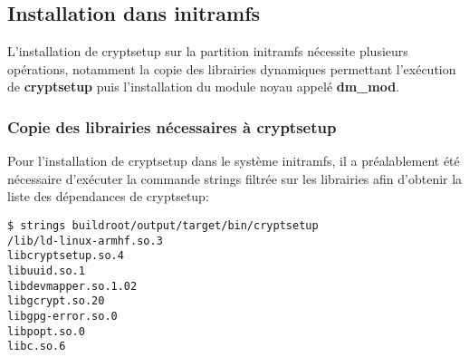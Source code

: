 \subsection{Installation dans initramfs}
L'installation de cryptsetup sur la partition initramfs nécessite plusieurs opérations, notamment la copie des librairies dynamiques permettant l'exécution de \textbf{cryptsetup} puis l'installation du module noyau appelé \textbf{dm\_mod}.

\subsubsection{Copie des librairies nécessaires à cryptsetup}
Pour l'installation de cryptsetup dans le système initramfs, il a préalablement été nécessaire d'exécuter la commande strings filtrée sur les librairies afin d'obtenir la liste des dépendances de cryptsetup:
\begin{lstlisting}[style=Bash]
$ strings buildroot/output/target/bin/cryptsetup
/lib/ld-linux-armhf.so.3
libcryptsetup.so.4
libuuid.so.1
libdevmapper.so.1.02
libgcrypt.so.20
libgpg-error.so.0
libpopt.so.0
libc.so.6
\end{lstlisting}
